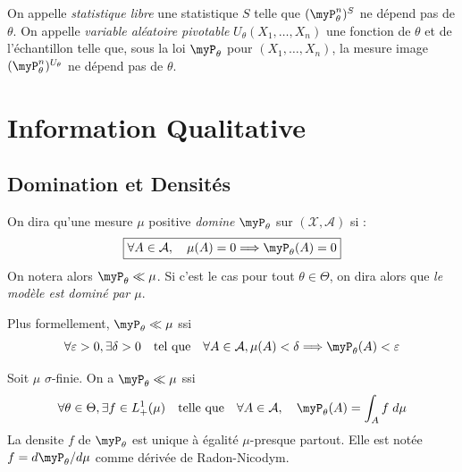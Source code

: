 \begin{definition}
    On appelle \emph{statistique libre} une statistique $S$ telle que $ ( \myP_\theta^n)^S$ ne dépend 
    pas de $ \theta$. 
    On appelle \emph{variable aléatoire pivotable} $U_\theta(X_1, \dots, X_n)$ une fonction de $ \theta$
    et de l'échantillon telle que, sous la loi $ \myP_\theta$ pour $(X_1, \dots, X_n)$, la mesure 
    image $ ( \myP_\theta^n)^{U_\theta}$ ne dépend pas de $ \theta$. 
\end{definition}



\section{Information Qualitative}

\subsection{Domination et Densités}

\begin{definition}[Domination]
    On dira qu'une mesure $ \mu$ positive \emph{domine} $ \myP_\theta$ sur $( \mathcal{X}, \mathcal{A})$ si : 
    \begin{equation}
        \boxed{
            \forall A \in \mathcal{A}, \quad \mu(A) = 0 \Longrightarrow \myP_\theta(A) = 0 
        }
    \end{equation}
    On notera alors $ \myP_\theta \ll \mu$.
    Si c'est le cas pour tout $ \theta \in \Theta$, on dira alors que \emph{le modèle est dominé par $ \mu$}.
\end{definition}

\begin{lemma}
    Plus formellement, $ \myP_\theta \ll \mu$ ssi 
    \begin{equation}
        \forall \varepsilon > 0, \exists \delta > 0 \quad \text{tel que} \quad 
        \forall A \in \mathcal{A}, \mu(A) < \delta \Longrightarrow \myP_\theta(A) < \varepsilon 
    \end{equation}
\end{lemma}

\begin{theorem}
    Soit $ \mu$ $ \sigma$-finie. On a $ \myP_\theta \ll \mu$ ssi 
    \begin{equation}
        \forall \theta \in \Theta, \exists f \in L^1_+( \mu) \quad \text{telle que} \quad 
        \forall A \in \mathcal{A}, \quad \myP_\theta(A) = \int_A f \; d \mu 
    \end{equation}
    La densite $f$ de $ \myP_\theta$ est unique à égalité $ \mu$-presque partout. Elle est notée 
    $f = d \myP_\theta / d \mu$ comme dérivée de Radon-Nicodym. 
\end{theorem}

